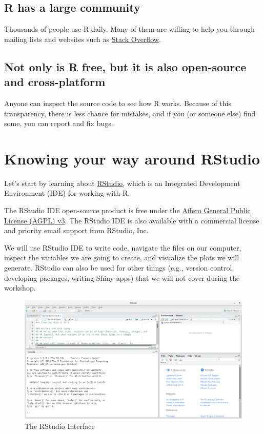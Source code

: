 \documentclass[]{book}
\theoremstyle{definition}
\theoremstyle{definition}
\theoremstyle{remark}
\begin{document}
\subsection{R has a large community}\label{r-has-a-large-community}

Thousands of people use R daily. Many of them are willing to help you
through mailing lists and websites such as
\href{https://stackoverflow.com/questions/tagged/r}{Stack Overflow}.

\subsection{Not only is R free, but it is also open-source and
cross-platform}\label{not-only-is-r-free-but-it-is-also-open-source-and-cross-platform}

Anyone can inspect the source code to see how R works. Because of this
transparency, there is less chance for mistakes, and if you (or someone
else) find some, you can report and fix bugs.

\section{Knowing your way around
RStudio}\label{knowing-your-way-around-rstudio}

Let's start by learning about \href{https://www.rstudio.com/}{RStudio},
which is an Integrated Development Environment (IDE) for working with R.

The RStudio IDE open-source product is free under the
\href{https://www.gnu.org/licenses/agpl-3.0.en.html}{Affero General
Public License (AGPL) v3}. The RStudio IDE is also available with a
commercial license and priority email support from RStudio, Inc.

We will use RStudio IDE to write code, navigate the files on our
computer, inspect the variables we are going to create, and visualize
the plots we will generate. RStudio can also be used for other things
(e.g., version control, developing packages, writing Shiny apps) that we
will not cover during the workshop.

\begin{figure}
\includegraphics[width=1\linewidth]{img/rstudio-screenshot} \caption{The RStudio Interface}\label{fig:RStudio-GUI}
\end{figure}
\end{document}
